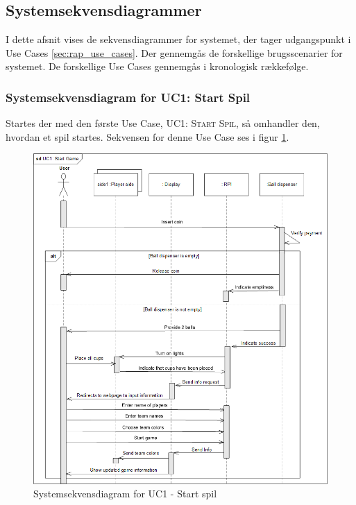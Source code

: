 \documentclass[Rapport/Rapport_main.tex]{subfiles}
\begin{document}
\subsection{Systemsekvensdiagrammer}
I dette afsnit vises de sekvensdiagrammer for systemet, der tager udgangspunkt i Use Cases \ref{sec:rap_use_cases}. Der gennemgås de forskellige brugsscenarier for systemet. De forskellige Use Cases gennemgås i kronologisk rækkefølge.

\subsubsection{Systemsekvensdiagram for UC1: Start Spil}
Startes der med den første Use Case, \textsc{UC1: Start Spil}, så omhandler den, hvordan et spil startes. Sekvensen for denne Use Case ses i figur \ref{fig:rap_sd_UC1}.
\begin{figure}[H]
    \centering
    \includegraphics[width=\textwidth]{Arkitektur/Sekvensdiagrammer/graphics/sd_UC1.png}
    \caption{Systemsekvensdiagram for UC1 - Start spil}
    \label{fig:rap_sd_UC1}
\end{figure}
\end{document}
